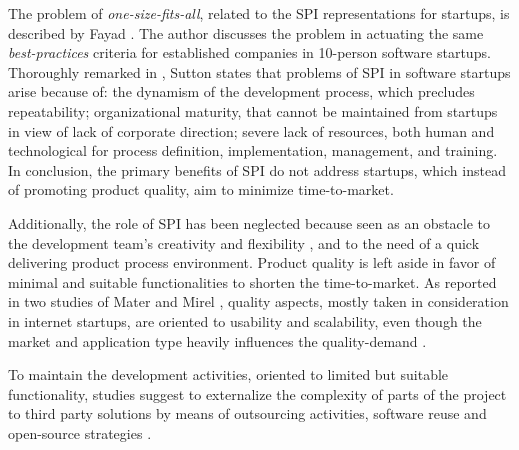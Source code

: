 \documentclass[10pt,journal,letterpaper,compsoc]{IEEEtran}
\begin{document}
The problem of \textit{one-size-fits-all}, related to the SPI  representations 
for startups, is described by Fayad \cite{Fayad1997}. The author discusses the 
problem in actuating the same \textit{best-practices} criteria for established 
companies in 10-person software startups. Thoroughly remarked in 
\cite{Sutton2000}, Sutton states that problems of SPI in software startups arise 
because of: the dynamism of the development process, which precludes 
repeatability; organizational maturity, that cannot be maintained from startups 
in view of lack of corporate direction; severe lack of resources, both human and 
technological for process definition, implementation, management, and training. 
In conclusion, the primary benefits of SPI do not address startups, which 
instead of promoting product quality, aim to minimize time-to-market.

Additionally, the role of SPI has been neglected because seen as an obstacle to 
the development team's creativity and flexibility \cite{Coleman2008a}, and to 
the need of a quick delivering product process environment. %
Product quality is left aside in favor of minimal and suitable functionalities 
to shorten the time-to-market. As reported in two studies of Mater and Mirel 
\cite{Mater2000, Mirel2000}, quality aspects, mostly taken in consideration in 
internet startups, are oriented to usability and scalability, even though the 
market and application type heavily influences the quality-demand 
\cite{Coleman2008, Kim2005}.

To maintain the development activities, oriented to limited but suitable 
functionality, studies suggest to externalize the complexity of parts of the 
project to third party solutions by means of outsourcing activities, software 
reuse and open-source strategies \cite{Hanna2010, Jansen2008, Wall2001, 
Bean2005}. %

\end{document}

